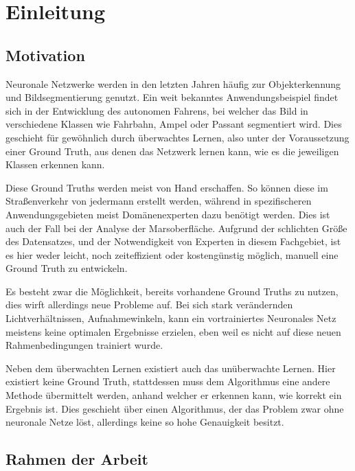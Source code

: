 \chapter{Einleitung}
\label{chap:einleitung}

\section{Motivation}
\label{sec:motivation}

Neuronale Netzwerke werden in den letzten Jahren häufig zur Objekterkennung und Bildsegmentierung genutzt. Ein weit bekanntes Anwendungsbeispiel findet sich in der Entwicklung des autonomen Fahrens, bei welcher das Bild in verschiedene Klassen wie \zB Fahrbahn, Ampel oder Passant segmentiert wird. Dies geschieht für gewöhnlich durch überwachtes Lernen, also unter der Voraussetzung einer Ground Truth, aus denen das Netzwerk lernen kann, wie es die jeweiligen Klassen erkennen kann.

Diese Ground Truths werden meist von Hand erschaffen. So können diese im Straßenverkehr von jedermann erstellt werden, während in spezifischeren Anwendungsgebieten meist Domänenexperten dazu benötigt werden. Dies ist auch der Fall bei der Analyse der Marsoberfläche. Aufgrund der schlichten Größe des Datensatzes, und der Notwendigkeit von Experten in diesem Fachgebiet, ist es hier weder leicht, noch zeiteffizient oder kostengünstig möglich, manuell eine Ground Truth zu entwickeln.

Es besteht zwar die Möglichkeit, bereits vorhandene Ground Truths zu nutzen, dies wirft allerdings neue Probleme auf. Bei \bspw sich stark verändernden Lichtverhältnissen, Aufnahmewinkeln, \oa kann ein vortrainiertes Neuronales Netz meistens keine optimalen Ergebnisse erzielen, eben weil es nicht auf diese neuen Rahmenbedingungen trainiert wurde.

Neben dem überwachten Lernen existiert auch das unüberwachte Lernen. Hier existiert keine Ground Truth, stattdessen muss dem Algorithmus eine andere Methode übermittelt werden, anhand welcher er erkennen kann, wie korrekt ein Ergebnis ist. Dies geschieht \zB über einen Algorithmus, der das Problem zwar ohne neuronale Netze löst, allerdings keine so hohe Genauigkeit besitzt.


\section{Rahmen der Arbeit}
\label{sec:rahmen}

